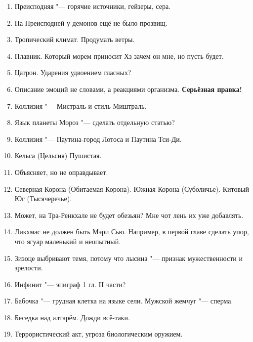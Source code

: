 \documentclass[a4paper,10pt]{book}
\begin{document}
\begin{enumerate}
\item Преисподняя "--- горячие источники, гейзеры, сера.

\item На Преисподней у демонов ещё не было прозвищ.

\item Тропический климат. Продумать ветры.

\item Плавник. Который морем приносит Хз зачем он мне, но пусть будет.

\item Цатрон. Ударения удвоением гласных?

\item Описание эмоций не словами, а реакциями организма. \textbf{Серьёзная правка!}

\item Коллизия "--- Мистраль и стиль Миштраль.

\item Язык планеты Мороз "--- сделать отдельную статью?

\item Коллизия "--- Паутина-город Лотоса и Паутина Тси-Ди.

\item Кельса (Цельсия) Пушистая.

\item Объясняет, но не оправдывает.

\item Северная Корона (Обитаемая Корона). Южная Корона (Суболичье). Китовый Юг (Тысячеречье). 

\item Может, на Тра-Ренкхале не будет обезьян? Мне чот лень их уже добавлять.

\item Ликхмас не должен быть Мэри Сью. Например, в первой главе сделать упор, что ягуар маленький и неопытный.

\item Зизоце выбривают темя, потому что лысина "--- признак мужественности и зрелости.

\item Инфинит "--- эпиграф 1 гл. II части?

\item Бабочка "--- грудная клетка на языке сели. Мужской жемчуг "--- сперма.

\item Беседка над алтарём. Дожди всё-таки.

\item Террористический акт, угроза биологическим оружием.


\end{enumerate}
\end{document}
